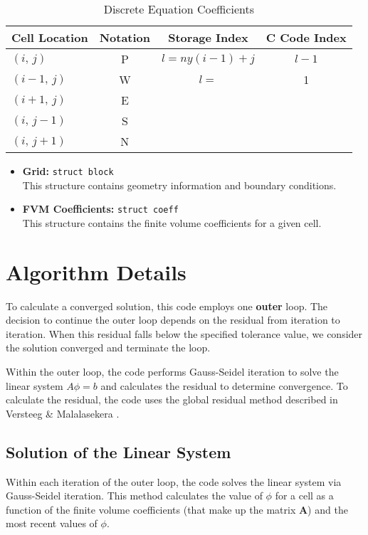 \documentclass{article}
\newcommand{\lp}{\left(}
\newcommand{\rp}{\right)}
\begin{document}
\begin{table}[!ht]
\caption{Discrete Equation Coefficients}
\centering
\begin{tabular}{l|c|c|c} \hline
   Cell Location & Notation & Storage Index           & C Code Index\footnotemark \\ \hline
   $(i,\,j)$     & P        & $l = ny\lp i-1 \rp + j$ & $l - 1$ \\
   $(i-1,\,j)$   & W        & $l = $ & 1 \\
   $(i+1,\,j)$   & E        &   & \\
   $(i,\,j-1)$   & S        &   & \\
   $(i,\,j+1)$   & N        &   & \\
\end{tabular}
\label{tab:idx_conv}
\end{table}


\begin{itemize}
    \item \textbf{Grid:} \texttt{struct block}\\ This structure contains geometry information and boundary conditions.
    \item \textbf{FVM Coefficients:} \texttt{struct coeff}\\ This structure contains the finite volume coefficients for a given cell.
    
\end{itemize}


\section{Algorithm Details}

To calculate a converged solution, this code employs one \textbf{outer} loop. The decision to continue the outer loop depends on the residual from iteration to iteration. When this residual falls below the specified tolerance value, we consider the solution converged and terminate the loop. 

Within the outer loop, the code performs Gauss-Seidel iteration to solve the linear system $A\phi = b$ and calculates the residual to determine convergence. To calculate the residual, the code uses the global residual method described in Versteeg \& Malalasekera \cite{introcfdfvm}.

\subsection{Solution of the Linear System}
Within each iteration of the outer loop, the code solves the linear system via Gauss-Seidel iteration. This method calculates the value of $\phi$ for a cell as a function of the finite volume coefficients (that make up the matrix $\mathbf{A}$) and the most recent values of $\phi$. 
\end{document}
